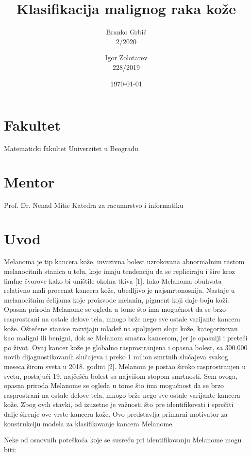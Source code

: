\documentclass{article}
\title{Klasifikacija malignog raka kože}
\author{
    Branko Grbić \\
    2/2020
    \and 
    Igor Zolotarev \\
    228/2019
}
\date{\today}
\begin{document}
\maketitle


\vfill
\hfill 
\section*{Fakultet}
Matematicki fakultet
\newline
Univerzitet u Beogradu

\section*{Mentor}
 Prof. Dr. Nenad Mitic
 \newline
Katedra za racunarstvo i informatiku

\newpage

\renewcommand{\contentsname}{Sadržaj}
\tableofcontents{}


\newpage
\section{Uvod} 
Melanoma je tip kancera kože, invazivna bolest uzrokovana abnormalnim rastom melanocitnih stanica u telu, koje imaju tendenciju da se repliciraju i šire kroz limfne čvorove kako bi uništile okolna tkiva [1]. Iako Melanoma obuhvata relativno mali procenat kancera kože, ubedljivo je najsmrtonosnija.
Nastaje u melanocitnim ćelijama koje proizvode melanin, pigment koji daje boju koži. Opasna priroda Melanome se ogleda u tome što ima mogućnost da se brzo rasprostrani na ostale delove tela, mnogo brže nego sve ostale varijante kancera kože.
Oštećene stanice razvijaju mladež na spoljnjem sloju kože, kategorizovan kao maligni ili benigni, dok se Melanom smatra kancerom, jer je opasniji i preteći po život. Ovaj kancer kože je globalno rasprostranjena i opasna bolest, sa 300.000 novih dijagnostikovanih slučajeva i preko 1 milion smrtnih slučajeva svakog meseca širom sveta u 2018. godini [2]. Melanom je postao široko rasprostranjen u svetu, postajući 19. najčešća bolest sa najvišom stopom smrtnosti. Sem ovoga, opasna priroda Melanome se ogleda u tome što ima mogućnost da se brzo rasprostrani na ostale delove tela, mnogo brže nego sve ostale varijante kancera kože. Zbog ovih stavki, od izuzetne je važnosti što pre identifikovati i sprečiti dalje širenje ove vrste kancera kože. Ovo predstavlja primarni motivator za konstrukciju modela za klasifikovanje kancera Melanome.
\par
Neke od osnovnih poteškoća koje se susreću pri identifikovanju Melanome mogu biti:
\end{document}
